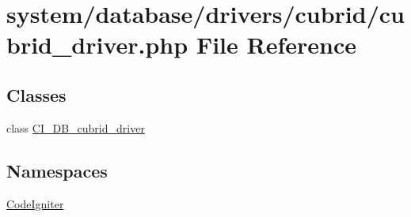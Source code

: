 \hypertarget{cubrid__driver_8php}{}\section{system/database/drivers/cubrid/cubrid\+\_\+driver.php File Reference}
\label{cubrid__driver_8php}
\subsection*{Classes}
\begin{DoxyCompactItemize}
\item 
class \mbox{\hyperlink{class_c_i___d_b__cubrid__driver}{C\+I\+\_\+\+D\+B\+\_\+cubrid\+\_\+driver}}
\end{DoxyCompactItemize}
\subsection*{Namespaces}
\begin{DoxyCompactItemize}
\item 
 \mbox{\hyperlink{namespace_code_igniter}{Code\+Igniter}}
\end{DoxyCompactItemize}
